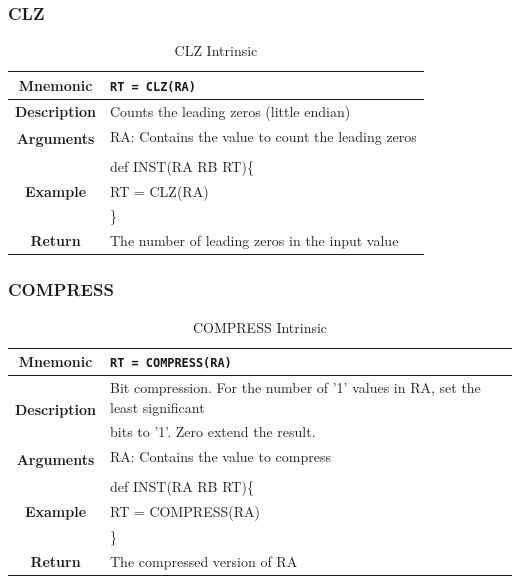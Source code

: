 \documentclass{article}
\begin{document}
\subsubsection{CLZ}
\label{sec:CLZ}

\begin{table}[h]
\begin{center}
\caption{CLZ Intrinsic}
\vspace{0.125in}
\label{tab:CLZIntrinsic}
\begin{tabular}{|c|l|}
\hline
\textbf{Mnemonic} & \texttt{RT = CLZ(RA)}\\
\hline
\textbf{Description} & Counts the leading zeros (little endian)\\
\hline
\multirow{2}{*}{\textbf{Arguments}} & RA: Contains the value to count the leading zeros\\
                          			     & \\
\hline
\multirow{3}{*}{\textbf{Example}} & def INST(RA RB RT)\{\\
                          			  &   RT = CLZ(RA)\\
                                                    & \}\\
\hline
\textbf{Return} & The number of leading zeros in the input value\\                                                    
\hline
\end{tabular}
\end{center}
\end{table}

\clearpage
\subsubsection{COMPRESS}
\label{sec:COMPRESS}

\begin{table}[h]
\begin{center}
\caption{COMPRESS Intrinsic}
\vspace{0.125in}
\label{tab:COMPRESSIntrinsic}
\begin{tabular}{|c|l|}
\hline
\textbf{Mnemonic} & \texttt{RT = COMPRESS(RA)}\\
\hline
\multirow{2}{*}{\textbf{Description}} & Bit compression.  For the number of '1' values in RA, set the least significant \\
						      & bits to '1'.  Zero extend the result.\\
\hline
\multirow{2}{*}{\textbf{Arguments}} & RA: Contains the value to compress\\
                          			     & \\
\hline
\multirow{3}{*}{\textbf{Example}} & def INST(RA RB RT)\{\\
                          			  &   RT = COMPRESS(RA)\\
                                                    & \}\\
\hline
\textbf{Return} & The compressed version of RA\\                                                    
\hline
\end{tabular}
\end{center}
\end{table}
\end{document}
